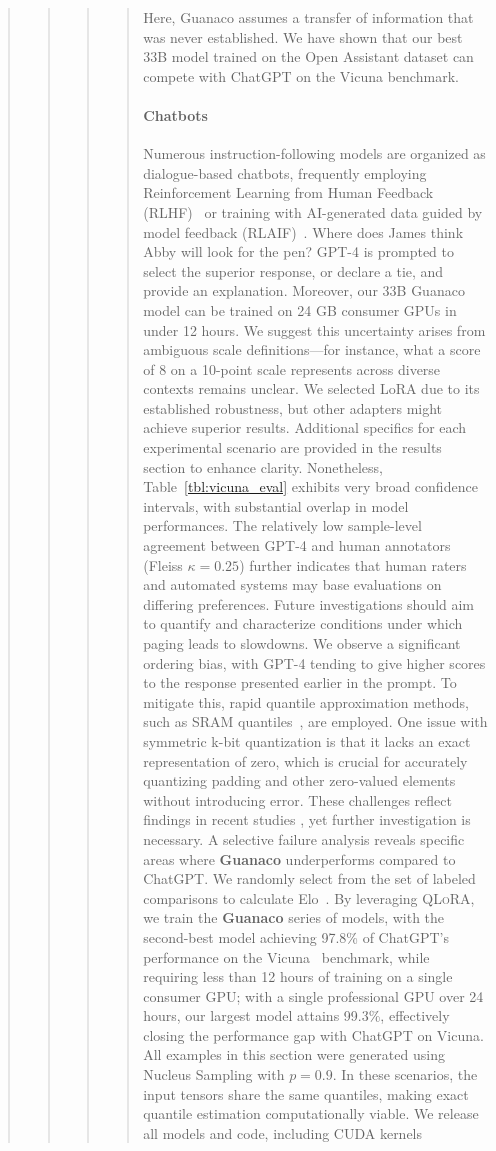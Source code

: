 \begin{quote}
\begin{abstract}
\begin{quote}
\begin{quote}
{Here, {Guanaco} assumes a transfer of information that was never established. We have shown that our best 33B model trained on the Open Assistant dataset can compete with ChatGPT on the Vicuna benchmark. \paragraph{Chatbots} Numerous instruction-following models are organized as dialogue-based chatbots, frequently employing Reinforcement Learning from Human Feedback (RLHF)~\citep{christiano2017deep} or training with AI-generated data guided by model feedback (RLAIF)~\citep{bai2022constitutional}. Where does James think Abby will look for the pen? GPT-4 is prompted to select the superior response, or declare a tie, and provide an explanation. Moreover, our 33B {Guanaco} model can be trained on 24 GB consumer GPUs in under 12 hours. We suggest this uncertainty arises from ambiguous scale definitions—for instance, what a score of 8 on a 10-point scale represents across diverse contexts remains unclear. We selected LoRA due to its established robustness, but other adapters might achieve superior results. Additional specifics for each experimental scenario are provided in the results section to enhance clarity. Nonetheless, Table~\ref{tbl:vicuna_eval} exhibits very broad confidence intervals, with substantial overlap in model performances. The relatively low sample-level agreement between GPT-4 and human annotators (Fleiss $\kappa=0.25$) further indicates that human raters and automated systems may base evaluations on differing preferences. Future investigations should aim to quantify and characterize conditions under which paging leads to slowdowns. We observe a significant ordering bias, with GPT-4 tending to give higher scores to the response presented earlier in the prompt. To mitigate this, rapid quantile approximation methods, such as SRAM quantiles~\citep{dettmers2022optimizers}, are employed. One issue with symmetric k-bit quantization is that it lacks an exact representation of zero, which is crucial for accurately quantizing padding and other zero-valued elements without introducing error. These challenges reflect findings in recent studies \cite{sap2022neural}, yet further investigation is necessary. A selective failure analysis reveals specific areas where \textbf{Guanaco} underperforms compared to ChatGPT. We randomly select from the set of labeled comparisons to calculate Elo~\citep{elo1967proposed,elo1978rating}. By leveraging \textsc{QLoRA}, we train the \textbf{Guanaco} series of models, with the second-best model achieving 97.8\% of ChatGPT’s performance on the Vicuna~\citep{vicuna2023} benchmark, while requiring less than 12 hours of training on a single consumer GPU; with a single professional GPU over 24 hours, our largest model attains 99.3\%, effectively closing the performance gap with ChatGPT on Vicuna. All examples in this section were generated using Nucleus Sampling \cite{holtzmancurious} with $p=0.9$. In these scenarios, the input tensors share the same quantiles, making exact quantile estimation computationally viable. We release all models and code, including CUDA kernels }
\end{quote}
\end{quote}
\end{abstract}
\end{quote}

